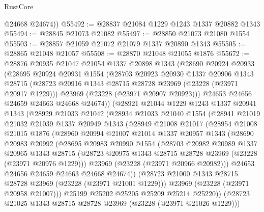 \begin{lexlean}{RustCore}
\begin{coremodule}
        @24668
        @24674))
@55492 := @28837 @21084 @1229 @1243 @1337 @20882 @1343
@55494 := @28845 @21073 @21082
@55497 := @28850 @21073 @21080 @1554
@55503 := @28857 @21059 @21072 @21079 @1337 @20890 @1343
@55505 := @28865 @21048 @21057
@55508 := @28870 @21048 @21055 @1876
@55672 := @28876
    @20935
    @21047
    @21054
    @1337
    @20898
    @1343
    (@28690
      @20924
      @20933
      (@28695
        @20924
        @20931
        @1554
        (@28703
          @20923
          @20930
          @1337
          @20906
          @1343
          @28715
          (@28723 @20916 @1343 @28715 @28728 @23969 (@23228 (@23971 @20917 @1229)))
          @23969
          (@23228 (@23971 @20907 @20923)))
        @24653
        @24656
        @24659
        @24663
        @24668
        @24674))
    (@28921
      @21044
      @1229
      @1243
      @1337
      @20941
      @1343
      (@28929
        @21033
        @21042
        (@28934
          @21033
          @21040
          @1554
          (@28941
            @21019
            @21032
            @21039
            @1337
            @20949
            @1343
            (@28949
              @21008
              @21017
              (@28954
                @21008
                @21015
                @1876
                (@28960
                  @20994
                  @21007
                  @21014
                  @1337
                  @20957
                  @1343
                  (@28690
                    @20983
                    @20992
                    (@28695
                      @20983
                      @20990
                      @1554
                      (@28703
                        @20982
                        @20989
                        @1337
                        @20965
                        @1343
                        @28715
                        (@28723 @20975 @1343 @28715 @28728 @23969 (@23228 (@23971 @20976 @1229)))
                        @23969
                        (@23228 (@23971 @20966 @20982)))
                      @24653
                      @24656
                      @24659
                      @24663
                      @24668
                      @24674))
                  (@28723 @21000 @1343 @28715 @28728 @23969 (@23228 (@23971 @21001 @1229)))
                  @23969
                  (@23228 (@23971 @20958 @21007)))
                @25199
                @25202
                @25205
                @25209
                @25214
                @25220))
            (@28723 @21025 @1343 @28715 @28728 @23969 (@23228 (@23971 @21026 @1229)))

\end{coremodule}
\end{lexlean}
